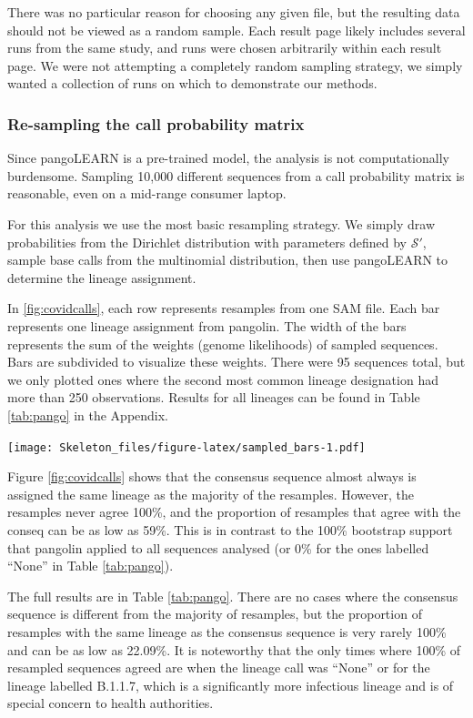 \documentclass[
]{article}
\newcommand{\nps}{\mathcal{S}} %
\begin{document}
There was no particular reason for choosing any given file, but the
resulting data should not be viewed as a random sample. Each result page
likely includes several runs from the same study, and runs were chosen
arbitrarily within each result page. We were not attempting a completely
random sampling strategy, we simply wanted a collection of runs on which
to demonstrate our methods.

\hypertarget{re-sampling-the-call-probability-matrix}{%
\subsubsection{Re-sampling the call probability
matrix}\label{re-sampling-the-call-probability-matrix}}

Since pangoLEARN is a pre-trained model, the analysis is not
computationally burdensome. Sampling 10,000 different sequences from a
call probability matrix is reasonable, even on a mid-range consumer
laptop.

For this analysis we use the most basic resampling strategy. We simply
draw probabilities from the Dirichlet distribution with parameters
defined by \(\nps'\), sample base calls from the multinomial
distribution, then use pangoLEARN to determine the lineage assignment.

In \ref{fig:covidcalls}, each row represents resamples from one SAM
file. Each bar represents one lineage assignment from pangolin. The
width of the bars represents the sum of the weights (genome likelihoods)
of sampled sequences. Bars are subdivided to visualize these weights.
There were 95 sequences total, but we only plotted ones where the second
most common lineage designation had more than 250 observations. Results
for all lineages can be found in Table \ref{tab:pango} in the Appendix.

\texttt{[image: Skeleton\_files/figure-latex/sampled\_bars-1.pdf]}

Figure \ref{fig:covidcalls} shows that the consensus sequence almost
always is assigned the same lineage as the majority of the resamples.
However, the resamples never agree 100\%, and the proportion of
resamples that agree with the conseq can be as low as 59\%. This is in
contrast to the 100\% bootstrap support that pangolin applied to all
sequences analysed (or 0\% for the ones labelled ``None'' in Table
\ref{tab:pango}).

The full results are in Table \ref{tab:pango}. There are no cases where
the consensus sequence is different from the majority of resamples, but
the proportion of resamples with the same lineage as the consensus
sequence is very rarely 100\% and can be as low as 22.09\%. It is
noteworthy that the only times where 100\% of resampled sequences agreed
are when the lineage call was ``None'' or for the lineage labelled
B.1.1.7, which is a significantly more infectious lineage and is of
special concern to health authorities.
\end{document}
